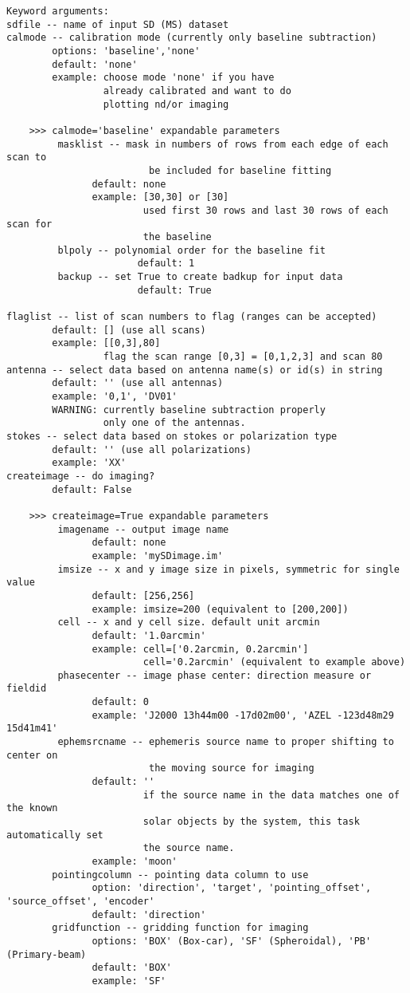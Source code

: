 \begin{verbatim}
Keyword arguments:
sdfile -- name of input SD (MS) dataset
calmode -- calibration mode (currently only baseline subtraction)
        options: 'baseline','none'
        default: 'none'
        example: choose mode 'none' if you have
                 already calibrated and want to do
                 plotting nd/or imaging 
    
    >>> calmode='baseline' expandable parameters
         masklist -- mask in numbers of rows from each edge of each scan to 
                         be included for baseline fitting
               default: none
               example: [30,30] or [30] 
                        used first 30 rows and last 30 rows of each scan for 
                        the baseline 
         blpoly -- polynomial order for the baseline fit
                       default: 1
         backup -- set True to create badkup for input data
                       default: True

flaglist -- list of scan numbers to flag (ranges can be accepted)  
        default: [] (use all scans)
        example: [[0,3],80]
                 flag the scan range [0,3] = [0,1,2,3] and scan 80 
antenna -- select data based on antenna name(s) or id(s) in string
        default: '' (use all antennas)
        example: '0,1', 'DV01'
        WARNING: currently baseline subtraction properly 
                 only one of the antennas.
stokes -- select data based on stokes or polarization type 
        default: '' (use all polarizations)
        example: 'XX'
createimage -- do imaging? 
        default: False 
        
    >>> createimage=True expandable parameters
         imagename -- output image name
               default: none
               example: 'mySDimage.im'
         imsize -- x and y image size in pixels, symmetric for single value
               default: [256,256]
               example: imsize=200 (equivalent to [200,200])
         cell -- x and y cell size. default unit arcmin
               default: '1.0arcmin'
               example: cell=['0.2arcmin, 0.2arcmin']
                        cell='0.2arcmin' (equivalent to example above)
         phasecenter -- image phase center: direction measure or fieldid 
               default: 0
               example: 'J2000 13h44m00 -17d02m00', 'AZEL -123d48m29 15d41m41'
         ephemsrcname -- ephemeris source name to proper shifting to center on 
                         the moving source for imaging
               default: ''
                        if the source name in the data matches one of the known 
                        solar objects by the system, this task automatically set 
                        the source name. 
               example: 'moon' 
        pointingcolumn -- pointing data column to use
               option: 'direction', 'target', 'pointing_offset', 'source_offset', 'encoder' 
               default: 'direction'
        gridfunction -- gridding function for imaging
               options: 'BOX' (Box-car), 'SF' (Spheroidal), 'PB' (Primary-beam)
               default: 'BOX'
               example: 'SF'
               

\end{verbatim}
